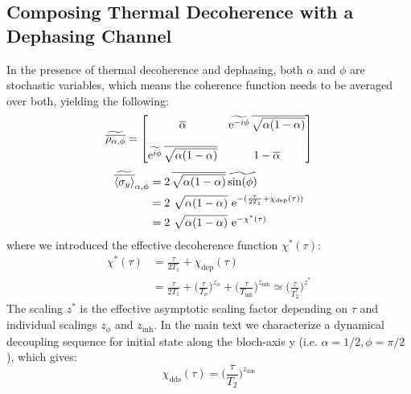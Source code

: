 \subsection{Composing Thermal Decoherence with a Dephasing Channel}
In the presence of thermal decoherence and dephasing, both $\alpha$ and $\phi$ are stochastic variables, which means the coherence function needs to be averaged over both, yielding the following:
\begin{equation}    \widetilde{\overline{\rho_{\alpha,\phi}}} = 
    \begin{bmatrix} 
    \overline{\alpha} & \widetilde{\text{e}^{-i\phi}} \, \overline{\sqrt{\alpha(1-\alpha)}} \\\\
    \widetilde{\text{e}^{i\phi}} \, \overline{\sqrt{\alpha(1-\alpha)}} & 1 - \overline{\alpha}
    \end{bmatrix}
\end{equation}
\begin{subequations}
    \begin{align}
     \widetilde{\overline{\langle\sigma_{y}\rangle}}_{\alpha,\phi} &= 
    2 \, \overline{\sqrt{\alpha(1-\alpha)}} \, \widetilde{\sin(\phi)}\\
    &= 2~\sqrt{\alpha(1-\alpha)}~\text{e}^{-(\frac{\tau}{2T_{1}}+\chi_{\text{dep}}(\tau))}\\
    &= 2~\sqrt{\alpha(1-\alpha)}~\text{e}^{-\chi^{*}(\tau)}
    \end{align}
\end{subequations}
where we introduced the effective decoherence function $\chi^{*}(\tau)$:
\begin{subequations}
\begin{align}
   \chi^{*}(\tau) &= \frac{\tau}{2T_{1}}+\chi_{\text{dep}}(\tau)\\
   &= \frac{\tau}{2T_{1}}+\bigg(\frac{\tau}{T_{\phi}}\bigg)^{z_{\phi}} + \bigg(\frac{\tau}{T_{\text{inh}}}\bigg)^{z_{\text{inh}}} \simeq \bigg(\frac{\tau}{T^{*}_{2}}\bigg)^{z^{*}}
\end{align}    
\end{subequations}
The scaling $z^{*}$ is the effective asymptotic scaling factor depending on $\tau$ and individual scalings $z_{\phi}$ and $z_{\text{inh}}$. In the main text we characterize a dynamical decoupling sequence for initial state along the bloch-axis y (i.e. $\alpha=1/2, \phi= \pi/2$), which gives:
\begin{equation}
    \chi_{\text{dds}}(\tau) = \bigg(\frac{\tau}{T_{2}}\bigg)^{z_{\text{dds}}}
\end{equation}
